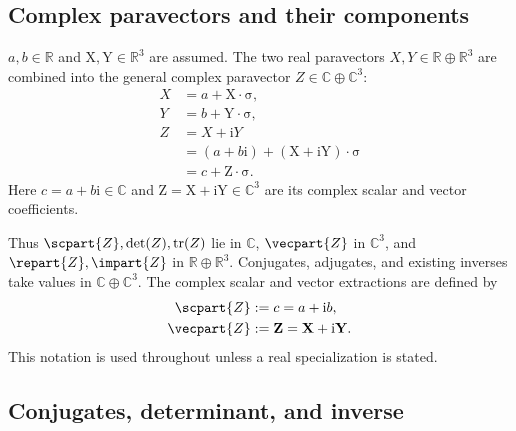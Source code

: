 \documentclass[11pt]{article}
\newcommand{\pv}[1]{{#1}}
\newcommand{\vstyle}[1]{{\bm{\mathrm{#1}}}}
\newcommand{\pX}{\pv{X}}
\newcommand{\pY}{\pv{Y}}
\newcommand{\pZ}{\pv{Z}}
\numberwithin{equation}{section}
\newcommand{\R}{\mathbb{R}}
\newcommand{\C}{\mathbb{C}}
\newcommand{\ii}{\mathrm{i}}
\newcommand{\dotprod}{\cdot}
\newcommand{\bsig}{\vstyle{\sigma}}
\newcommand{\bX}{\vstyle{X}}
\newcommand{\bY}{\vstyle{Y}}
\newcommand{\bZ}{\vstyle{Z}}
\begin{document}
\subsection{Complex paravectors and their components}
\label{sec:paravectors}

$a,b\in\R$ and $\bX,\bY\in\R^3$ are assumed. The two real paravectors
$\pX,\pY\in\R\oplus\R^3$ are combined into the general complex paravector
$\pZ\in\C\oplus\C^3$:
\begin{align*}
 \pX&=a+\bX\dotprod\bsig,\\
 \pY&=b+\bY\dotprod\bsig,\\[4pt]
 \pZ&=\pX+\ii \pY\\
  &=(a+b\ii)+(\bX+\ii\bY)\dotprod\bsig\\
  &=c+\bZ\dotprod\bsig.
\end{align*}
Here $c=a+b\ii\in\C$ and $\bZ=\bX+\ii\bY\in\C^3$ are its
complex scalar and vector coefficients.

Thus $\scpart{\pZ},\det(\pZ),\operatorname{tr}(\pZ)$ lie in $\C$,
$\vecpart{\pZ}$ in $\C^3$, and $\repart{\pZ},\impart{\pZ}$
in $\R\oplus\R^3$. Conjugates, adjugates, and existing inverses take values
in $\C\oplus\C^3$.
The complex scalar and vector extractions are defined by
\begin{align*}
 \scpart {\pZ}&:=c=a+\ii b,\\
 \vecpart {\pZ}&:=\bZ=\bX+\ii\bY.
\end{align*}
This notation is used throughout unless a real specialization is stated.

\subsection{Conjugates, determinant, and inverse}
\label{sec:algebra-operations}
\end{document}
